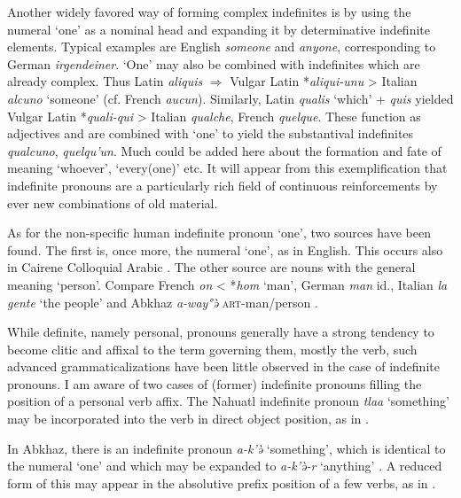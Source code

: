 Another widely favored way of forming complex indefinites is by using the numeral ‘one’ as a nominal head and expanding it by determinative indefinite elements. Typical examples are English \textit{someone} and \textit{anyone}, corresponding to German \textit{irgendeiner}. ‘One’ may also be combined with indefinites which are already complex. Thus Latin \textit{aliquis} $\Rightarrow $ Vulgar Latin *\textit{aliqui-unu} {\textgreater} Italian \textit{alcuno} ‘someone’ (cf. French \textit{aucun}). Similarly, Latin \textit{qualis} ‘which’ + \textit{quis} yielded Vulgar Latin *\textit{quali-qui} {\textgreater} Italian \textit{qualche}, French \textit{quelque}. These function as adjectives and are combined with ‘one’ to yield the substantival indefinites \textit{qualcuno}, \textit{quelqu'un}. Much could be added here about the formation and fate of meaning ‘whoever’, ‘every(one)’ etc. It will appear from this exemplification that indefinite pronouns are a particularly rich field of continuous reinforcements by ever new combinations of old material.

As for the non-specific human indefinite pronoun ‘one’, two sources have been found. The first is, once more, the numeral ‘one’, as in English. This occurs also in Cairene Colloquial Arabic \citep[79]{GaryEtAl1982}. The other source are nouns with the general meaning ‘person’. Compare French \textit{on} {\textless} *\textit{hom} ‘man’, German \textit{man} id., Italian \textit{la gente} ‘the people’ and Abkhaz \textit{a-way°\`ə} \textsc{art}{}-man/person \citep[157f]{Hewitt1979}.

While definite, namely personal, pronouns generally have a strong tendency to become clitic and affixal to the term governing them, mostly the verb, such advanced grammaticalizations have been little observed in the case of indefinite pronouns. I am aware of two cases of (former) indefinite pronouns filling the position of a personal verb affix. The Nahuatl indefinite pronoun \textit{tlaa} ‘something’ may be incorporated into the verb in direct object position, as in .

\noindent In Abkhaz, there is an indefinite pronoun \textit{a-k'\`ə} ‘something’, which is identical to the numeral ‘one’ and which may be expanded to \textit{a-k'\`ə-r} ‘anything’ \citep[158]{Hewitt1979}. A reduced form of this may appear in the absolutive prefix position of a few verbs, as in .

